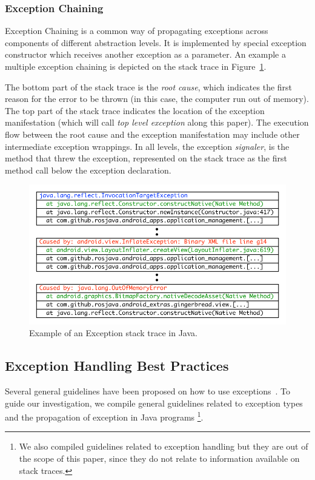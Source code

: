 \documentclass[conference]{IEEEtran}
\begin{document}
\subsubsection{Exception Chaining} Exception Chaining is a common way of
propagating exceptions across components of different abstraction levels. It is
implemented by special exception constructor which receives another exception as
a parameter. An example a multiple exception chaining is depicted on the stack
trace in Figure~\ref{fig:wrapping}.

The bottom part of the stack trace is the \emph{root cause}, which indicates the
first reason for the error to be thrown (in this case, the computer run out of
memory). The top part of the stack trace indicates the location of the exception
manifestation (which will call \emph{top level exception} along this paper). The
execution flow  between the root cause and the exception manifestation may
include other intermediate exception wrappings. In all levels, the exception
\emph{signaler}, is the method that threw the exception, represented on the
stack trace as the first method call below the exception declaration.

\begin{figure} \centering \includegraphics[scale=0.6]{wrappings}
\caption{Example of an Exception stack trace in Java.}
\label{fig:wrapping}
\end{figure}

\subsection{Exception Handling Best Practices}
\label{sec:best}

Several general guidelines have been proposed on how to use
exceptions~\cite{mandrioli1992advances,gosling2000java,wirfs2006toward,
bloch2008effective}. To guide our investigation, we compile general guidelines
related to exception types and the propagation of exception in Java programs
\footnote{We also compiled guidelines related to exception handling but they are
out of the scope of this paper, since they do not relate to information
available on stack traces.}.
\end{document}
